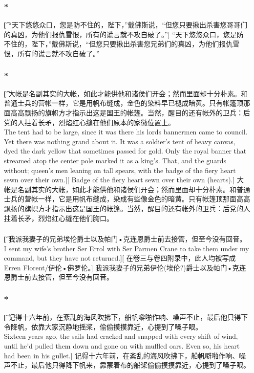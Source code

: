 \documentclass[12pt,a4paper]{article}
\begin{document}
\subsubsection{\color{red}*}\t[
	“天下悠悠众口，您是防不住的，陛下，”戴佛斯说，“但您只要揪出杀害您哥哥们的真凶，为他们报仇雪恨，所有的谎言就不攻自破了。”]
	“天下悠悠众口，您是防不住的，陛下，”戴佛斯说，“但您只要揪出杀害您兄弟们的真凶，为他们报仇雪恨，所有的谎言就不攻自破了。”

\subsubsection{\color{red}*}\t[	
	大帐是名副其实的大帐，如此才能供他和诸侯们开会；然而里面却十分朴素。和普通士兵的营帐一样，它是用帆布缝成，金色的染料早已褪成暗黄。只有帐篷顶那面高高飘扬的旗帜方才指示出这是国王的帐篷。当然，醒目的还有帐外的卫兵：后党的人拄着长矛，烈焰红心缝在他们原本的家徽位置上。\\
	The tent had to be large, since it was there his lords bannermen came to council. Yet there was nothing grand about it. It was a soldier's tent of heavy canvas, dyed the dark yellow that sometimes passed for gold. Only the royal banner that streamed atop the center pole marked it as a king's. That, and the guards without; queen's men leaning on tall spears, with the badge of the fiery heart sewn over their own.][
	Badge of the fiery heart sewn over their own (hearts).]
	大帐是名副其实的大帐，如此才能供他和诸侯们开会；然而里面却十分朴素。和普通士兵的营帐一样，它是用帆布缝成，染成有些像金色的暗黄。只有帐篷顶那面高高飘扬的旗帜方才指示出这是国王的帐篷。当然，醒目的还有帐外的卫兵：后党的人拄着长矛，烈焰红心缝在他们胸口。
	
\subsubsection{}\t[
	我派我妻子的兄弟埃伦爵士以及帕门•克连恩爵士前去接管，但至今没有回音。\\
	I sent my wife's brother Ser Errol with Ser Parmen Crane to take them under my command, but they have not returned.][
	在卷三与卷四附录中，此人均被写成Erren Florent/伊伦•佛罗伦。]
	我派我妻子的兄弟伊伦(埃伦?)爵士以及帕门•克连恩爵士前去接管，但至今没有回音。
	
\subsubsection{\color{red}*}\t[
	记得十六年前，在紊乱的海风吹拂下，船帆噼啪作响、噪声不止，最后他只得下令降帆，依靠大家沉静地摇桨，偷偷摸摸靠近，心提到了嗓子眼。\\
	Sixteen years ago, the sails had cracked and snapped with every shift of wind, until he'd pulled them down and gone on with muffled oars. Even so, his heart had been in his gullet.]
	记得十六年前，在紊乱的海风吹拂下，船帆噼啪作响、噪声不止，最后他只得降下帆来，靠蒙着布的船桨偷偷摸摸靠近，心提到了嗓子眼。
	
\end{document}
